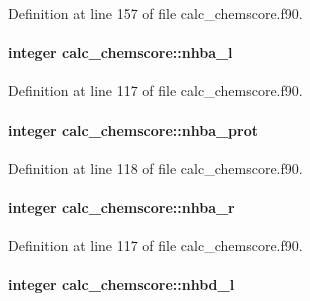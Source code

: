 Definition at line 157 of file calc\-\_\-chemscore.\-f90.

\hypertarget{classcalc__chemscore_a1b8de903d8b742309e2a5fda2f90fe2e}{
\paragraph[{nhba\-\_\-l}]{\setlength{\rightskip}{0pt plus 5cm}integer calc\-\_\-chemscore\-::nhba\-\_\-l}}\label{classcalc__chemscore_a1b8de903d8b742309e2a5fda2f90fe2e}


Definition at line 117 of file calc\-\_\-chemscore.\-f90.

\hypertarget{classcalc__chemscore_afbfb586ffade33d234a7bce3ec4899e4}{
\paragraph[{nhba\-\_\-prot}]{\setlength{\rightskip}{0pt plus 5cm}integer calc\-\_\-chemscore\-::nhba\-\_\-prot}}\label{classcalc__chemscore_afbfb586ffade33d234a7bce3ec4899e4}


Definition at line 118 of file calc\-\_\-chemscore.\-f90.

\hypertarget{classcalc__chemscore_a3ee7fc10e0807111d9574989ecc56269}{
\paragraph[{nhba\-\_\-r}]{\setlength{\rightskip}{0pt plus 5cm}integer calc\-\_\-chemscore\-::nhba\-\_\-r}}\label{classcalc__chemscore_a3ee7fc10e0807111d9574989ecc56269}


Definition at line 117 of file calc\-\_\-chemscore.\-f90.

\hypertarget{classcalc__chemscore_a77e25979c44ad62df2302682ed5ce099}{
\paragraph[{nhbd\-\_\-l}]{\setlength{\rightskip}{0pt plus 5cm}integer calc\-\_\-chemscore\-::nhbd\-\_\-l}}\label{classcalc__chemscore_a77e25979c44ad62df2302682ed5ce099}


